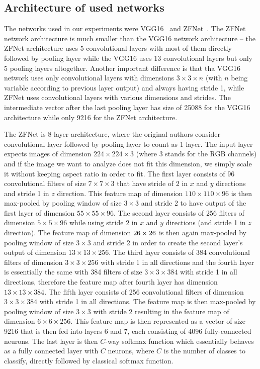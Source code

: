 \subsection{Architecture of used networks}

The networks used in our experiments were VGG16~\cite{vgg16} and ZFNet~\cite{zfnet}. The ZFNet network architecture is much smaller than the VGG16 network architecture -- the ZFNet architecture uses 5 convolutional layers with most of them directly followed by pooling layer while the VGG16 uses 13 convolutional layers but only 5 pooling layers altogether. Another important difference is that tha VGG16 network uses only convolutional layers with dimensions $3\times3\times n$ (with $n$ being variable according to previous layer output) and always having stride 1, while ZFNet uses convolutional layers with various dimensions and strides. The intermediate vector after the last pooling layer has size of 25088 for the VGG16 architecture while only 9216 for the ZFNet architecture.

The ZFNet is 8-layer architecture, where the original authors consider convolutional layer followed by pooling layer to count as 1 layer. The input layer expects images of dimension $224\times224\times3$ (where 3 stands for the RGB channels) and if the image we want to analyze does not fit this dimension, we simply scale it without keeping aspect ratio in order to fit. The first layer consists of 96 convolutional filters of size $7\times7\times3$ that have stride of 2 in $x$ and $y$ directions and stride 1 in $z$ direction. This feature map of dimension $110\times110\times96$ is then max-pooled by pooling window of size $3\times3$ and stride 2 to have output of the first layer of dimension $55\times55\times96$. The second layer consists of 256 filters of dimension $5\times5\times96$ while using stride 2 in $x$ and $y$ directions (and stride 1 in $z$ direction). The feature map of dimension $26\times26\time256$ is then again max-pooled by pooling window of size $3\times3$ and stride 2 in order to create the second layer's output of dimension $13\times13\times256$. The third layer consists of 384 convolutional filters of dimension $3\times3\times256$ with stride 1 in all directions and the fourth layer is essentially the same with 384 filters of size $3\times3\times384$ with stride 1 in all directions, therefore the feature map after fourth layer has dimension $13\times13\times384$. The fifth layer consists of 256 convolutional filters of dimension $3\times3\times384$ with stride 1 in all directions. The feature map is then max-pooled by pooling window of size $3\times3$ with stride 2 resulting in the feature map of dimension $6\times6\times256$. This feature map is then represented as a vector of size 9216 that is then fed into layers 6 and 7, each consisting of 4096 fully-connected neurons. The last layer is then $C$-way softmax function which essentially behaves as a fully connected layer with $C$ neurons, where $C$ is the number of classes to classify, directly followed by classical softmax function.

